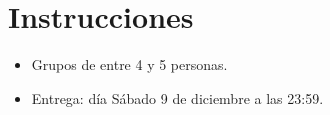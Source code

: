 \documentclass[12pt]{article}
\theoremstyle{exampstyle}
\theoremstyle{definition}
\theoremstyle{break}
\numberwithin{equation}{section}
\begin{document}
\section*{Instrucciones}
\begin{itemize}
    \item Grupos de entre 4 y 5 personas.
    \item Entrega: d\'ia S\'abado 9 de diciembre a las 23:59.
\end{itemize}
\end{document}

